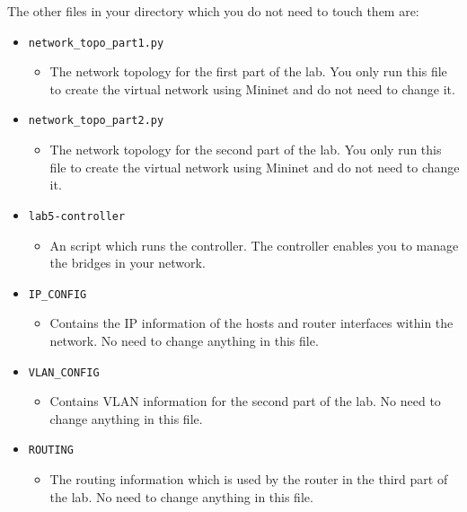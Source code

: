 \documentclass[11pt]{article}
\begin{document}
The other files in your directory which you do not need to touch them are:
\begin{itemize}
    \item \texttt{network\_topo\_part1.py}
        \begin{itemize}
            \item The network topology for the first part of the lab. You only run this file to create the virtual network using Mininet and do not need to change it.
        \end{itemize}

    \item \texttt{network\_topo\_part2.py}
        \begin{itemize}
            \item The network topology for the second part of the lab. You only run this file to create the virtual network using Mininet and do not need to change it.
        \end{itemize}

    \item \texttt{lab5-controller}
        \begin{itemize}
            \item An script which runs the controller. The controller enables you to manage the bridges in your network.
        \end{itemize}

    \item \texttt{IP\_CONFIG}
        \begin{itemize}
            \item Contains the IP information of the hosts and router interfaces within the network. No need to change anything in this file.
        \end{itemize}

    \item \texttt{VLAN\_CONFIG}
        \begin{itemize}
            \item Contains VLAN information for the second part of the lab. No need to change anything in this file.
        \end{itemize}
    \item \texttt{ROUTING}
        \begin{itemize}
            \item The routing information which is used by the router in the third part of the lab. No need to change anything in this file.
        \end{itemize}
\end{itemize}
\end{document}
